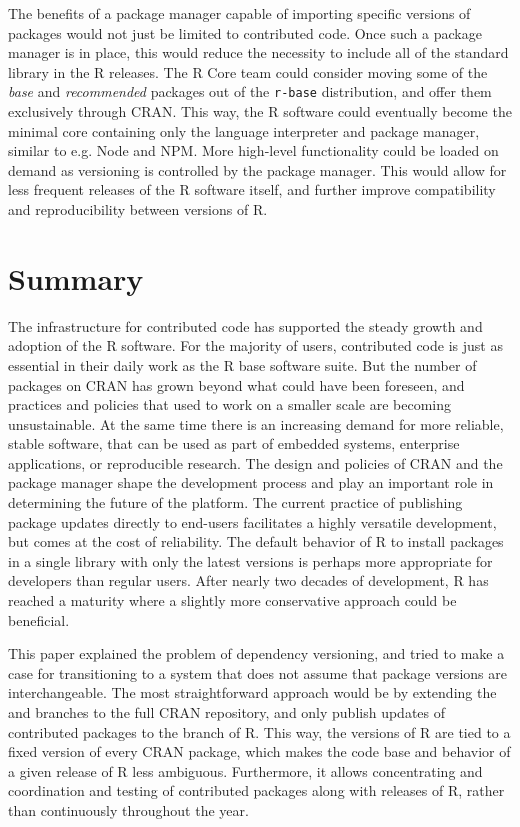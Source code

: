 The benefits of a package manager capable of importing specific versions of
packages would not just be limited to contributed code. Once such a package
manager is in place, this would reduce the necessity to include all of the
standard library in the R releases. The R Core team could consider moving some
of the \emph{base} and \emph{recommended} packages out of the \texttt{r-base}
distribution, and offer them exclusively through CRAN. This way, the R software
could eventually become the minimal core containing only the language
interpreter and package manager, similar to e.g. Node and NPM. More high-level
functionality could be loaded on demand as versioning is controlled by the
package manager. This would allow for less frequent releases of the R software
itself, and further improve compatibility and reproducibility between versions
of R.

\section{Summary}

The infrastructure for contributed code has supported the steady growth and
adoption of the R software. For the majority of users, contributed code is just
as essential in their daily work as the R base software suite. But the number
of packages on CRAN has grown beyond what could have been foreseen, and
practices and policies that used to work on a smaller scale are becoming
unsustainable. At the same time there is an increasing demand for more
reliable, stable software, that can be used as part of embedded systems,
enterprise applications, or reproducible research. The design and policies of
CRAN and the package manager shape the development process and play an
important role in determining the future of the platform. The current practice
of publishing package updates directly to end-users facilitates a highly
versatile development, but comes at the cost of reliability. The default
behavior of R to install packages in a single library with only the latest
versions is perhaps more appropriate for developers than regular users. After
nearly two decades of development, R has reached a maturity where a slightly
more conservative approach could be beneficial.

This paper explained the problem of dependency versioning, and tried to make
a case for transitioning to a system that does not assume that package versions
are interchangeable. The most straightforward approach would be by extending
the  and  branches to the full CRAN repository, and
only publish updates of contributed packages to the 
branch of R. This way, the  versions of R are tied to a fixed
version of every CRAN package, which makes the code base and behavior of a
given release of R less ambiguous. Furthermore, it allows concentrating
and coordination and testing of contributed packages along with releases of R,
rather than continuously throughout the year.

